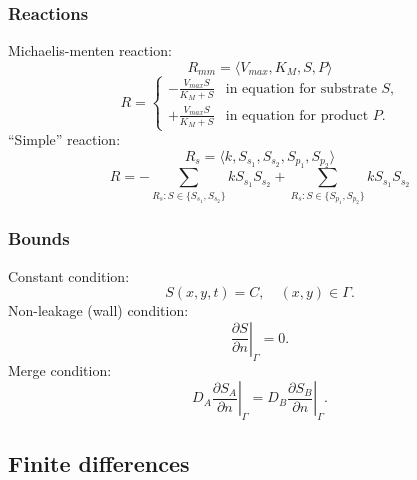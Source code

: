 \documentclass[a4paper,10pt]{article}
\begin{document}
\subsubsection{Reactions}

Michaelis-menten reaction:
\begin{equation}
    R_{mm} = \langle V_{max}, K_M, S, P \rangle
\end{equation}
\begin{equation}
    R = \begin{cases}
            -\frac{V_{max} S}{K_M + S} & \text{in equation for substrate $S$,}
            \\
            +\frac{V_{max} S}{K_M + S} & \text{in equation for product $P$.}
        \end{cases}
\end{equation}
%
``Simple'' reaction:
\begin{equation}
    R_{s} = \langle k, S_{s_1}, S_{s_2}, S_{p_1}, S_{p_2} \rangle
\end{equation}
\begin{equation}
    R =
        - \sum_{R_s : S \in \{S_{s_1}, S_{s_2}\}} k S_{s_1} S_{s_2}
        + \sum_{R_s : S \in \{S_{p_1}, S_{p_2}\}} k S_{s_1} S_{s_2}
\end{equation}



\subsubsection{Bounds}
Constant condition:
\begin{equation}
    S(x, y, t) = C,\quad (x, y) \in \Gamma.
\end{equation}
Non-leakage (wall) condition:
\begin{equation}
    \left.\frac{\partial S}{\partial n}\right|_{\Gamma} = 0.
\end{equation}
Merge condition:
\begin{equation}
    D_A \left.\frac{\partial S_A}{\partial n}\right|_{\Gamma} =
    D_B \left.\frac{\partial S_B}{\partial n}\right|_{\Gamma}.
\end{equation}





\subsection{Finite differences}
\end{document}
